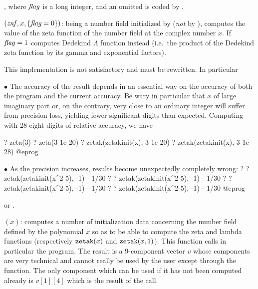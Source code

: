 , where $\hbox{\it f\kern0pt lag\/}$
is a long integer, and an omitted  is coded by .

$(\hbox{\it znf\/},x,\{\hbox{\it f\kern0pt lag\/}=0\})$:  being a number
field initialized by  (\emph{not} by ),
computes the value of the  zeta function of the number
field at the complex number $x$. If $\hbox{\it f\kern0pt lag\/}=1$ computes Dedekind $\Lambda$
function instead (i.e.~the product of the Dedekind zeta function by its gamma
and exponential factors).

 This implementation is not satisfactory and must be
rewritten. In particular

$\bullet$ The accuracy of the result depends in an essential way on the
accuracy of both the  program and the current accuracy.
Be wary in particular that $x$ of large imaginary part or, on the
contrary, very close to an ordinary integer will suffer from precision
loss, yielding fewer significant digits than expected. Computing with 28
eight digits of relative accuracy, we have

\bprog
? zeta(3)
    ? zeta(3-1e-20)
    ? zetak(zetakinit(x), 3-1e-20)
    ? zetak(zetakinit(x), 3-1e-28)
@eprog

$\bullet$ As the precision increases, results become unexpectedly
completely wrong:
\bprog
    ? 
    ? zetak(zetakinit(x^2-5), -1) - 1/30 
    ? 
    ? zetak(zetakinit(x^2-5), -1) - 1/30 
    ? 
    ? zetak(zetakinit(x^2-5), -1) - 1/30
    ? 
    ? zetak(zetakinit(x^2-5), -1) - 1/30
@eprog

 or
.

$(x)$: computes a number of initialization data
concerning the number field defined by the polynomial $x$ so as to be able
to compute the  zeta and lambda functions (respectively
${\tt zetak}(x)$ and ${\tt zetak}(x,1)$). This function calls in particular
the  program. The result is a 9-component vector $v$ whose
components are very technical and cannot really be used by the user except
through the  function. The only component which can be used if
it has not been computed already is $v[1][4]$ which is the result of the
 call.

